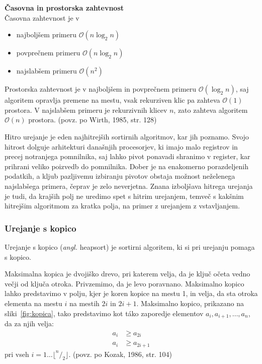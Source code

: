 \documentclass[a4paper,oneside,12pt]{article}
\newcommand{\subsubsubsection}[1]{\vspace*{1ex}\textbf{#1}\\}
\begin{document}
\subsubsubsection{Časovna in prostorska zahtevnost}
Časovna zahtevnost je v
\begin{itemize}
  \item najboljšem primeru $\mathcal{O}(n\log_2 n)$
  \item povprečnem primeru $\mathcal{O}(n\log_2 n)$
  \item najslabšem primeru $\mathcal{O}(n^2)$
\end{itemize}

Prostorska zahtevnost je v najboljšem in povprečnem primeru $\mathcal{O}(\log_2 n)$, 
saj algoritem opravlja premene na mestu, vsak rekurziven klic pa zahteva $\mathcal{O}(1)$ prostora.
V najslabšem primeru je rekurzivnih klicev $n$, zato zahteva algoritem
$\mathcal{O}(n)$ prostora.
(povz. po Wirth, 1985, str. 128)

Hitro urejanje je eden najhitrejših sortirnih algoritmov, kar jih
poznamo. Svojo hitrost dolguje arhitekturi današnjih procesorjev, ki imajo
malo registrov in precej notranjega pomnilnika, saj lahko pivot ponavadi shranimo v
register, kar prihrani veliko poizvedb do pomnilnika. Dober je na enakomerno
porazdeljenih podatkih, a kljub pazljivemu izbiranju pivotov obstaja možnost neželenega
najslabšega primera, čeprav je zelo neverjetna. Znana izboljšava hitrega
urejanja je tudi, da krajših polj ne uredimo spet s hitrim urejanjem, temveč s
kakšnim hitrejšim algoritmom za kratka polja, na primer z urejanjem z
vstavljanjem.

\subsubsection{Urejanje s kopico}
\label{chapter:heapsort}
Urejanje s kopico (\emph{angl.} heapsort) je sortirni algoritem,
ki si pri urejanju pomaga s kopico.

Maksimalna kopica je dvojiško drevo, pri katerem velja, da je ključ očeta
vedno večji od ključa otroka. Privzemimo, da je levo poravnano.
Maksimalno kopico lahko predstavimo v polju, kjer je koren kopice na mestu 
1, in velja, da sta otroka elementa na mestu $i$ na mestih $2i$ in $2i + 1$.
Maksimalno kopico, prikazano na sliki~\ref{fig:kopica}, tako predstavimo kot
t\'{a}ko zaporedje elementov $a_i, a_{i+1}, \ldots,
a_n$, da za njih velja:
\begin{align*}
  a_i &\geq a_{2i} \\
  a_i &\geq a_{2i+1}
\end{align*}
pri vseh $i = 1 \ldots \lfloor ^n/_2 \rfloor$.
(povz. po Kozak, 1986, str. 104)
\end{document}
